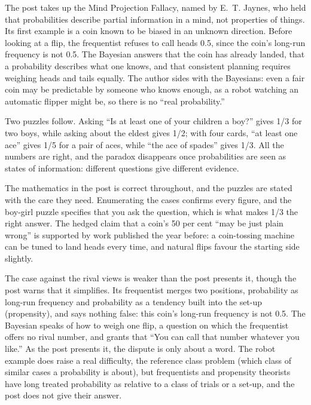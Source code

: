 \begin{afterword}
\summaryhead

The post takes up the Mind Projection Fallacy, named by E.~T. Jaynes, who held that probabilities describe partial information in a mind, not properties of things. Its first example is a coin known to be biased in an unknown direction. Before looking at a flip, the frequentist refuses to call heads 0.5, since the coin's long-run frequency is not 0.5. The Bayesian answers that the coin has already landed, that a probability describes what one knows, and that consistent planning requires weighing heads and tails equally. The author sides with the Bayesians: even a fair coin may be predictable by someone who knows enough, as a robot watching an automatic flipper might be, so there is no ``real probability.''

Two puzzles follow. Asking ``Is at least one of your children a boy?'' gives 1/3 for two boys, while asking about the eldest gives 1/2; with four cards, ``at least one ace'' gives 1/5 for a pair of aces, while ``the ace of spades'' gives 1/3. All the numbers are right, and the paradox disappears once probabilities are seen as states of information: different questions give different evidence.

\responsehead

The mathematics in the post is correct throughout, and the puzzles are stated with the care they need. Enumerating the cases confirms every figure, and the boy-girl puzzle specifies that you ask the question, which is what makes 1/3 the right answer. The hedged claim that a coin's 50 per cent ``may be just plain wrong'' is supported by work published the year before: a coin-tossing machine can be tuned to land heads every time, and natural flips favour the starting side slightly.

The case against the rival views is weaker than the post presents it, though the post warns that it simplifies. Its frequentist merges two positions, probability as long-run frequency and probability as a tendency built into the set-up (propensity), and says nothing false: this coin's long-run frequency is not 0.5. The Bayesian speaks of how to weigh one flip, a question on which the frequentist offers no rival number, and grants that ``You can call that number whatever you like.'' As the post presents it, the dispute is only about a word. The robot example does raise a real difficulty, the reference class problem (which class of similar cases a probability is about), but frequentists and propensity theorists have long treated probability as relative to a class of trials or a set-up, and the post does not give their answer.


\end{afterword}
